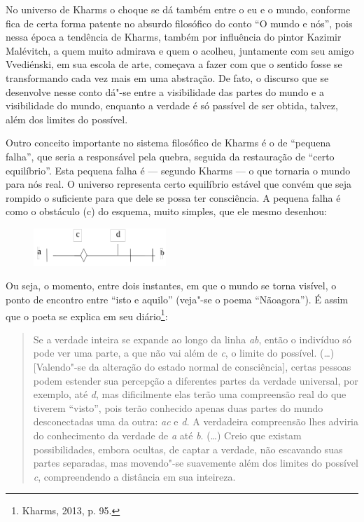 {{{No universo de Kharms o choque se dá também entre o eu e o mundo,
conforme fica de certa forma patente no absurdo filosófico do conto ``O
mundo e nós'', pois nessa época a tendência de Kharms, também por
influência do pintor Kazimir Malévitch, a quem muito admirava e quem o
acolheu, juntamente com seu amigo Vvediénski, em sua escola de arte,
começava a fazer com que o sentido fosse se transformando cada vez mais
em uma abstração. De fato, o discurso que se desenvolve nesse conto
dá"-se entre a visibilidade das partes do mundo e a visibilidade do
mundo, enquanto a verdade é só passível de ser obtida, talvez, além dos
limites do possível.

Outro conceito importante no sistema filosófico de Kharms é o de
``pequena falha'', que seria a responsável pela quebra, seguida da
restauração de ``certo equilíbrio''. Esta pequena falha é --- segundo
Kharms --- o que tornaria o mundo para nós real. O universo representa
certo equilíbrio estável que convém que seja rompido o suficiente para
que dele se possa ter consciência. A pequena falha é como o obstáculo
(c) do esquema, muito simples, que ele mesmo desenhou:

\begin{figure}[!ht]
\centering
  \includegraphics[width=50mm]{./imgs/fig6.jpg}
\end{figure}

Ou seja, o momento, entre dois instantes, em que o mundo se torna
visível, o ponto de encontro entre ``isto e aquilo'' (veja"-se o poema
``Nãoagora''). É assim que o poeta se explica em seu diário\footnote{Kharms, 2013, p. 95.}:

\begin{quote}
Se a verdade inteira se expande ao longo da linha \emph{ab}, então o
indivíduo só pode ver uma parte, a que não vai além de \emph{c}, o
limite do possível. (\ldots{}) {[}Valendo"-se da alteração do estado
normal de consciência{]}, certas pessoas podem estender sua percepção a
diferentes partes da verdade universal, por exemplo, até \emph{d}, mas
dificilmente elas terão uma compreensão real do que tiverem ``visto'',
pois terão conhecido apenas duas partes do mundo desconectadas uma da
outra: \emph{ac} e \emph{d.} A verdadeira compreensão lhes adviria do
conhecimento da verdade de \emph{a} até \emph{b}. (\ldots{}) Creio que
existam possibilidades, embora ocultas, de captar a verdade, não
escavando suas partes separadas, mas movendo"-se suavemente além dos
limites do possível \emph{c}, compreendendo a distância em sua
inteireza.



\end{quote}}}}
